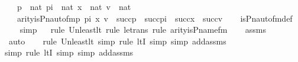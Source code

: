 \begin{isabellebody}
\ \ \ {\isachardoublequoteopen}p\ {\isasymin}\ nat{\isachardoublequoteclose}\ {\isachardoublequoteopen}pi\ {\isasymin}\ nat{\isachardoublequoteclose}\ {\isachardoublequoteopen}x\ {\isasymin}\ nat{\isachardoublequoteclose}\ {\isachardoublequoteopen}v\ {\isasymin}\ nat{\isachardoublequoteclose}\ \isanewline
\ \ \ {\isachardoublequoteopen}arity{\isacharparenleft}{\kern0pt}is{\isacharunderscore}{\kern0pt}Pn{\isacharunderscore}{\kern0pt}auto{\isacharunderscore}{\kern0pt}fm{\isacharparenleft}{\kern0pt}p{\isacharcomma}{\kern0pt}\ pi{\isacharcomma}{\kern0pt}\ x{\isacharcomma}{\kern0pt}\ v{\isacharparenright}{\kern0pt}{\isacharparenright}{\kern0pt}\ {\isasymle}\ succ{\isacharparenleft}{\kern0pt}p{\isacharparenright}{\kern0pt}\ {\isasymunion}\ succ{\isacharparenleft}{\kern0pt}pi{\isacharparenright}{\kern0pt}\ {\isasymunion}\ succ{\isacharparenleft}{\kern0pt}x{\isacharparenright}{\kern0pt}\ {\isasymunion}\ succ{\isacharparenleft}{\kern0pt}v{\isacharparenright}{\kern0pt}{\isachardoublequoteclose}\isanewline
%
\isadelimproof
\isanewline
\ \ %
\endisadelimproof
%
\isatagproof
{}\isamarkupfalse%
\ is{\isacharunderscore}{\kern0pt}Pn{\isacharunderscore}{\kern0pt}auto{\isacharunderscore}{\kern0pt}fm{\isacharunderscore}{\kern0pt}def\ \isanewline
\ \ \isamarkupfalse%
\ simp\isanewline
\ \ \isamarkupfalse%
{\isacharparenleft}{\kern0pt}rule\ Un{\isacharunderscore}{\kern0pt}least{\isacharunderscore}{\kern0pt}lt{\isacharcomma}{\kern0pt}\ rule\ le{\isacharunderscore}{\kern0pt}trans{\isacharcomma}{\kern0pt}\ rule\ arity{\isacharunderscore}{\kern0pt}is{\isacharunderscore}{\kern0pt}P{\isacharunderscore}{\kern0pt}name{\isacharunderscore}{\kern0pt}fm{\isacharparenright}{\kern0pt}\isanewline
\ \ \isamarkupfalse%
\ assms\ \isanewline
\ \ \ \ \ \isamarkupfalse%
\ auto{\isacharbrackleft}{\kern0pt}{}{\isacharbrackright}{\kern0pt}\isanewline
\ \ \ \isamarkupfalse%
{\isacharparenleft}{\kern0pt}rule\ Un{\isacharunderscore}{\kern0pt}least{\isacharunderscore}{\kern0pt}lt{\isacharcomma}{\kern0pt}\ simp{\isacharcomma}{\kern0pt}\ rule\ ltI{\isacharcomma}{\kern0pt}\ simp{\isacharcomma}{\kern0pt}\ simp\ add{\isacharcolon}{\kern0pt}assms{\isacharparenright}{\kern0pt}\isanewline
\ \ \ \isamarkupfalse%
{\isacharparenleft}{\kern0pt}simp{\isacharcomma}{\kern0pt}\ rule\ ltI{\isacharcomma}{\kern0pt}\ simp{\isacharcomma}{\kern0pt}\ simp\ add{\isacharcolon}{\kern0pt}assms{\isacharparenright}{\kern0pt}\isanewline
\ \ \isamarkupfalse%

\end{isabellebody}
